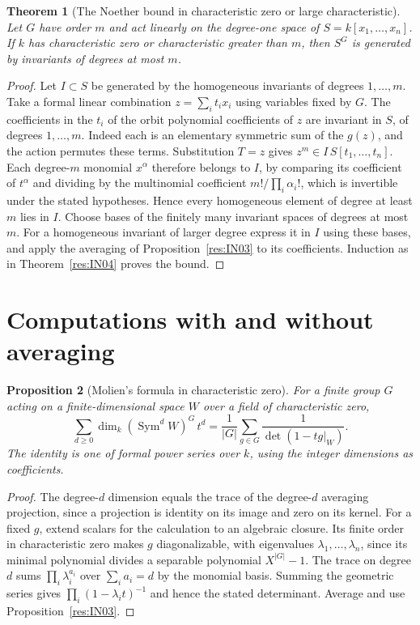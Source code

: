\documentclass[11pt,oneside,openany]{book}
\newtheorem{theorem}{Theorem}[chapter]
\newtheorem{proposition}[theorem]{Proposition}
\theoremstyle{definition}
\theoremstyle{remark}
\begin{document}
\begin{theorem}[The Noether bound in characteristic zero or large characteristic]
\label{res:IN07}
Let \(G\) have order \(m\) and act linearly on the
degree-one space of \(S=k[x_1,\ldots,x_n]\). If \(k\) has
characteristic zero or characteristic greater than \(m\),
then \(S^G\) is generated by invariants of degrees at most \(m\).
\end{theorem}
\begin{proof}
Let \(I\subset S\) be generated by the homogeneous invariants of
degrees \(1,\ldots,m\). Take a formal linear combination
\(z=\sum_i t_i x_i\) using variables fixed by \(G\). The
coefficients in the \(t_i\) of the orbit polynomial coefficients
of \(z\) are invariant in \(S\), of degrees \(1,\ldots,m\).
Indeed each is an elementary symmetric sum of the \(g(z)\),
and the action permutes these terms. Substitution \(T=z\)
gives \(z^m\in I\,S[t_1,\ldots,t_n]\).
Each degree-\(m\) monomial \(x^\alpha\) therefore belongs
to \(I\), by comparing its coefficient of \(t^\alpha\)
and dividing by the multinomial coefficient
\(m!/\prod_i\alpha_i!\), which is invertible under the
stated hypotheses. Hence every homogeneous element of
degree at least \(m\) lies in \(I\). Choose bases of the
finitely many invariant spaces of degrees at most \(m\).
For a homogeneous invariant of larger degree express it
in \(I\) using these bases, and apply the averaging of
Proposition~\ref{res:IN03} to its coefficients.
Induction as in Theorem~\ref{res:IN04} proves the bound.
\end{proof}

\section{Computations with and without averaging}

\begin{proposition}[Molien's formula in characteristic zero]
\label{res:IN08}
For a finite group \(G\) acting on a finite-dimensional
space \(W\) over a field of characteristic zero,
\[
 \sum_{d\ge0} \dim_k(\operatorname{Sym}^d W)^G\,t^d
       =\frac{1}{|G|}\sum_{g\in G}\frac{1}{\det(1-tg|_W)}.
\]
The identity is one of formal power series over \(k\), using
the integer dimensions as coefficients.
\end{proposition}
\begin{proof}
The degree-\(d\) dimension equals the trace of the degree-\(d\)
averaging projection, since a projection is identity on its
image and zero on its kernel. For a fixed \(g\), extend scalars
for the calculation to an algebraic closure. Its finite order
in characteristic zero makes \(g\) diagonalizable, with
eigenvalues \(\lambda_1,\ldots,\lambda_n\), since its minimal
polynomial divides a separable polynomial \(X^{|G|}-1\).
The trace on degree \(d\) sums \(\prod_i\lambda_i^{a_i}\) over
\(\sum_i a_i=d\) by the monomial basis. Summing the geometric
series gives \(\prod_i(1-\lambda_i t)^{-1}\) and hence the
stated determinant. Average and use Proposition~\ref{res:IN03}.
\end{proof}
\end{document}
